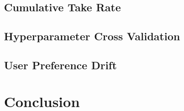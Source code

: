 \documentclass{article}
\begin{document}
\subsection{Cumulative Take Rate}

\subsection{Hyperparameter Cross Validation}

\subsection{User Preference Drift}

\section{Conclusion}

\nocite{kawale2015efficient}
\nocite{wang2017online}
\nocite{zhao2013interactive}
\nocite{cherkassky2013sequential}



\end{document}
